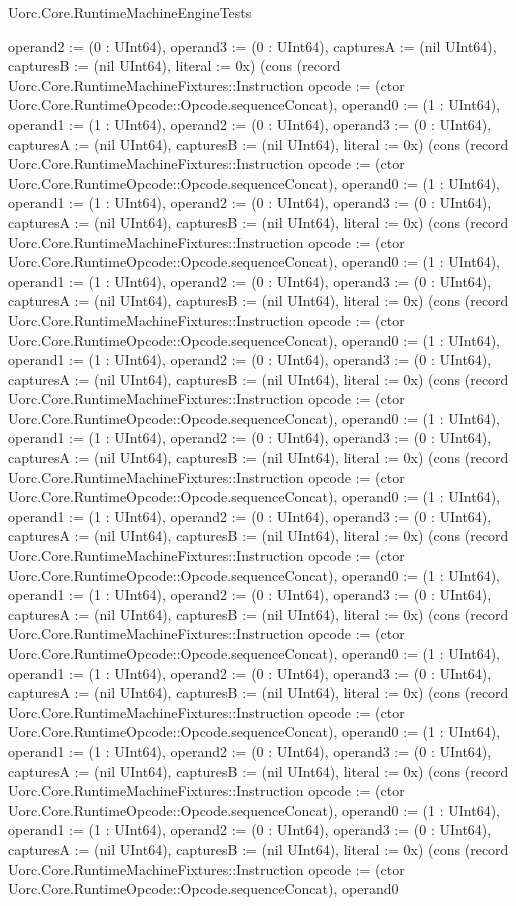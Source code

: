 \begin{lexlean}{Uorc.Core.RuntimeMachineEngineTests}
\begin{semanticmodule}
{operand2 := (0 : UInt64), operand3 := (0 : UInt64), capturesA := (nil UInt64), capturesB := (nil UInt64), literal := 0x}) (cons (record Uorc.Core.RuntimeMachineFixtures::Instruction {opcode := (ctor Uorc.Core.RuntimeOpcode::Opcode.sequenceConcat), operand0 := (1 : UInt64), operand1 := (1 : UInt64), operand2 := (0 : UInt64), operand3 := (0 : UInt64), capturesA := (nil UInt64), capturesB := (nil UInt64), literal := 0x}) (cons (record Uorc.Core.RuntimeMachineFixtures::Instruction {opcode := (ctor Uorc.Core.RuntimeOpcode::Opcode.sequenceConcat), operand0 := (1 : UInt64), operand1 := (1 : UInt64), operand2 := (0 : UInt64), operand3 := (0 : UInt64), capturesA := (nil UInt64), capturesB := (nil UInt64), literal := 0x}) (cons (record Uorc.Core.RuntimeMachineFixtures::Instruction {opcode := (ctor Uorc.Core.RuntimeOpcode::Opcode.sequenceConcat), operand0 := (1 : UInt64), operand1 := (1 : UInt64), operand2 := (0 : UInt64), operand3 := (0 : UInt64), capturesA := (nil UInt64), capturesB := (nil UInt64), literal := 0x}) (cons (record Uorc.Core.RuntimeMachineFixtures::Instruction {opcode := (ctor Uorc.Core.RuntimeOpcode::Opcode.sequenceConcat), operand0 := (1 : UInt64), operand1 := (1 : UInt64), operand2 := (0 : UInt64), operand3 := (0 : UInt64), capturesA := (nil UInt64), capturesB := (nil UInt64), literal := 0x}) (cons (record Uorc.Core.RuntimeMachineFixtures::Instruction {opcode := (ctor Uorc.Core.RuntimeOpcode::Opcode.sequenceConcat), operand0 := (1 : UInt64), operand1 := (1 : UInt64), operand2 := (0 : UInt64), operand3 := (0 : UInt64), capturesA := (nil UInt64), capturesB := (nil UInt64), literal := 0x}) (cons (record Uorc.Core.RuntimeMachineFixtures::Instruction {opcode := (ctor Uorc.Core.RuntimeOpcode::Opcode.sequenceConcat), operand0 := (1 : UInt64), operand1 := (1 : UInt64), operand2 := (0 : UInt64), operand3 := (0 : UInt64), capturesA := (nil UInt64), capturesB := (nil UInt64), literal := 0x}) (cons (record Uorc.Core.RuntimeMachineFixtures::Instruction {opcode := (ctor Uorc.Core.RuntimeOpcode::Opcode.sequenceConcat), operand0 := (1 : UInt64), operand1 := (1 : UInt64), operand2 := (0 : UInt64), operand3 := (0 : UInt64), capturesA := (nil UInt64), capturesB := (nil UInt64), literal := 0x}) (cons (record Uorc.Core.RuntimeMachineFixtures::Instruction {opcode := (ctor Uorc.Core.RuntimeOpcode::Opcode.sequenceConcat), operand0 := (1 : UInt64), operand1 := (1 : UInt64), operand2 := (0 : UInt64), operand3 := (0 : UInt64), capturesA := (nil UInt64), capturesB := (nil UInt64), literal := 0x}) (cons (record Uorc.Core.RuntimeMachineFixtures::Instruction {opcode := (ctor Uorc.Core.RuntimeOpcode::Opcode.sequenceConcat), operand0 := (1 : UInt64), operand1 := (1 : UInt64), operand2 := (0 : UInt64), operand3 := (0 : UInt64), capturesA := (nil UInt64), capturesB := (nil UInt64), literal := 0x}) (cons (record Uorc.Core.RuntimeMachineFixtures::Instruction {opcode := (ctor Uorc.Core.RuntimeOpcode::Opcode.sequenceConcat), operand0 := (1 : UInt64), operand1 := (1 : UInt64), operand2 := (0 : UInt64), operand3 := (0 : UInt64), capturesA := (nil UInt64), capturesB := (nil UInt64), literal := 0x}) (cons (record Uorc.Core.RuntimeMachineFixtures::Instruction {opcode := (ctor Uorc.Core.RuntimeOpcode::Opcode.sequenceConcat), operand0 }
\end{semanticmodule}
\end{lexlean}
